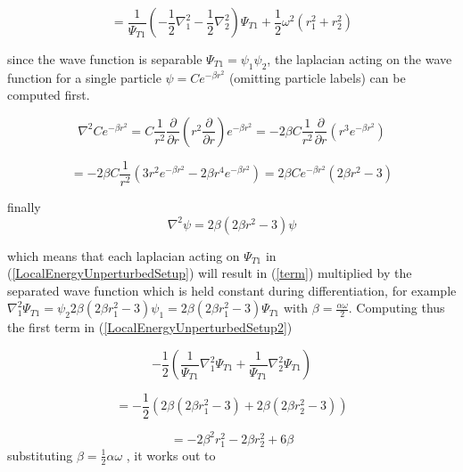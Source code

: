 \documentclass[aip,nobalancelastpage,
twocolumn,
rsi,%
 amsmath,amssymb,
 reprint,%
]{revtex4}
\begin{document}
\begin{equation}
\label{LocalEnergyUnperturbedSetup2}
=\frac{1}{\Psi_{T1}}\left( -\frac{1}{2}\nabla_1^2 -\frac{1}{2}\nabla_2^2\right)\Psi_{T1} + \frac{1}{2}\omega^2 (r_1^2+r_2^2) 
\end{equation}

since the wave function is separable $\Psi_{T1} = \psi_1 \psi_2$, the laplacian acting on the wave function for a single particle $\psi = Ce^{-\beta r^2}$ (omitting particle labels) can be computed first. 

\small
\begin{equation*}
 \nabla^2 Ce^{-\beta r^2} = C\frac{1}{r^2}\frac{\partial}{\partial r}\left(r^2 \frac{\partial}{\partial r} \right) e^{-\beta r^2}= -2\beta C \frac{1}{r^2}\frac{\partial}{\partial r}\left(r^3 e^{-\beta r^2}\right)
\end{equation*}

\begin{equation*}
= -2\beta C\frac{1}{r^2}\left(3r^2 e^{-\beta r^2} -2\beta r^4 e^{-\beta r^2}\right) = 2\beta C e^{-\beta r^2}\left(2\beta r^2 - 3\right)
\end{equation*}

\normalsize


finally
\begin{equation}
\label{term}
\nabla^2 \psi= 2\beta \left( 2\beta r^2 - 3\right)\psi
\end{equation}

which means that each laplacian acting on $\Psi_{T1}$ in (\ref{LocalEnergyUnperturbedSetup}) will result in (\ref{term}) multiplied by the separated wave function which is held constant during differentiation, for example $\nabla_1^2 \Psi_{T1} = \psi_2 2\beta (2\beta r_1^2 -3)\psi_1=2\beta (2\beta r_1^2-3)\Psi_{T1}$ with $\beta = \frac{\alpha \omega}{2}$.
Computing thus the first term in (\ref{LocalEnergyUnperturbedSetup2})

\begin{equation}
-\frac{1}{2}\left(\frac{1}{\Psi_{T1}}\nabla_1^2\Psi_{T1} + \frac{1}{\Psi_{T1}}\nabla_2^2\Psi_{T1}\right)
\end{equation}

\begin{equation}
= -\frac{1}{2}\left(2\beta\left(2\beta r_1^2-3\right) + 2\beta\left(2\beta r_2^2-3\right)\right)
\end{equation}

\begin{equation}
= -2\beta^2r_1^2 - 2\beta r_2^2 + 6\beta
\end{equation}
substituting $\beta = \frac{1}{2}\alpha \omega$ , it works out to
\end{document}
